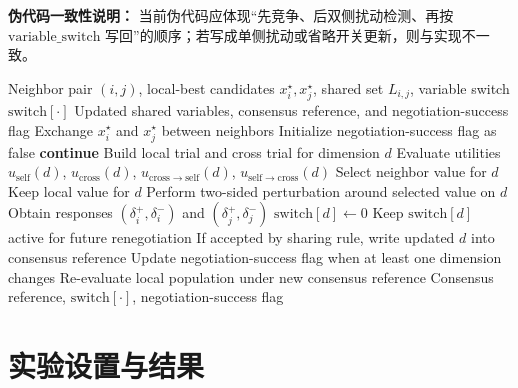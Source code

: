 \documentclass[conference]{IEEEtran}
\begin{document}
\textbf{伪代码一致性说明：} 当前伪代码应体现“先竞争、后双侧扰动检测、再按 \(\mathrm{variable\_switch}\) 写回”的顺序；若写成单侧扰动或省略开关更新，则与实现不一致。

\begin{algorithm}[t]
  \footnotesize
  \caption{Negotiation with Two-Sided Consistency Check (Abstract)}
  \label{alg:negotiation_consistency}
  \begin{algorithmic}[1]
  \Require Neighbor pair $(i,j)$, local-best candidates $x_i^\star,x_j^\star$, shared set $L_{i,j}$, variable switch $\mathrm{switch}[\cdot]$
  \Ensure Updated shared variables, consensus reference, and negotiation-success flag
  \State Exchange $x_i^\star$ and $x_j^\star$ between neighbors
  \State Initialize negotiation-success flag as false
      \State \textbf{continue} 
    \EndIf
    \State Build local trial and cross trial for dimension $d$
    \State Evaluate utilities $u_{\mathrm{self}}(d)$, $u_{\mathrm{cross}}(d)$,
    \Statex \hspace{1.5em}$u_{\mathrm{cross}\rightarrow\mathrm{self}}(d)$, $u_{\mathrm{self}\rightarrow\mathrm{cross}}(d)$
      \State Select neighbor value for $d$
    \Else
      \State Keep local value for $d$
    \EndIf
    \State Perform two-sided perturbation around selected value on $d$
    \State Obtain responses $(\delta_i^+,\delta_i^-)$ and $(\delta_j^+,\delta_j^-)$
      \State $\mathrm{switch}[d]\gets 0$ 
    \Else
      \State Keep $\mathrm{switch}[d]$ active for future renegotiation
    \EndIf
    \State If accepted by sharing rule, write updated $d$ into consensus reference
    \State Update negotiation-success flag when at least one dimension changes
  \EndFor
  \State Re-evaluate local population under new consensus reference
  \State \Return Consensus reference, $\mathrm{switch}[\cdot]$, negotiation-success flag
  \end{algorithmic}
  \end{algorithm}

\section{实验设置与结果}\label{sec:experiments}
\end{document}
